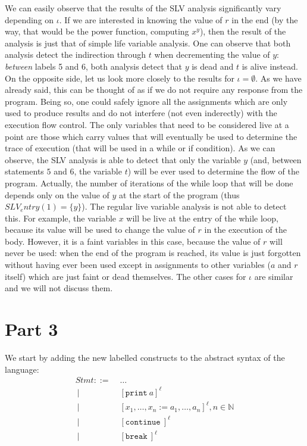 \documentclass[a4wide,12pt]{article}
\def\N{\mathbb{N}}
\def\print{\texttt{print}\ }
\def\cont {\texttt{continue}\ }
\def\breakc{\texttt{break}\ }
\begin{document}
We can easily observe that the results of the SLV analysis significantly vary depending on $\iota$. 
If we are interested in knowing the value of $r$ in the end (by the way, that would be the power
function, computing $x^y$), then the result of the analysis is
just that of simple life variable analysis. One can observe that both analysis detect the indirection
through $t$ when decrementing the value of $y$: \emph{between} labels 5 and 6,
both analysis detect that $y$ is dead and $t$ is alive instead. On the opposite side, let us look
more closely to the results for $\iota = \emptyset$. As we have already said, this can be
thought of as if we do not require any response from the program. Being so, one could
safely ignore all the assignments
which are only used to 
produce results and do not interfere (not even inderectly) with the execution flow control.
The only variables that need
to be considered live at a point are those which carry values that will eventually be used
to determine the trace of execution (that will be used in a while or if condition). As we can observe,
the SLV analysis is able to detect that only the variable $y$ (and, between statements $5$ and $6$, 
the variable $t$) will be ever used to determine the flow of the program. Actually, the number of iterations of the while loop that will be done depends only on the value of $y$ at the start of the program
(thus $SLV_entry(1) = \{y\}$). The regular live variable analysis is not able to detect this.
For example, the variable $x$ will be live at the entry of the
while loop, because its value will be used to change the value of $r$ in the execution of the body.
However, it is a faint variables in this case, because the value of $r$ will never be used:
when the end of the program is reached, its value is just forgotten without having ever been used
except in assignments to other variables ($a$ and $r$ itself) which are just faint or dead themselves.
The other cases for $\iota$ are similar and we will not discuss them.


\section{Part 3}
 
We start by adding the new labelled constructs to the abstract syntax of the language:
\begin{align*}
 Stmt ::= \; & \ldots \\
 ~ |\;\; & [\print a]^\ell \\
 ~ |\;\; & [x_1,\ldots,x_n := a_1,\ldots,a_n]^\ell , n \in \N \\
 ~ |\;\; & [\cont]^\ell \\
 ~ |\;\; & [\breakc]^\ell
\end{align*}
 
\end{document}
